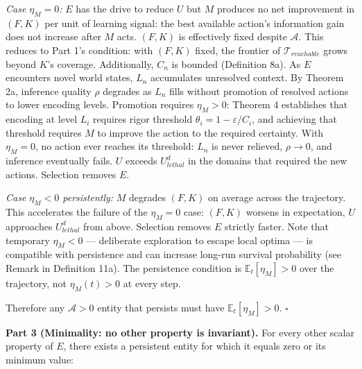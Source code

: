 \documentclass[
]{article}
\begin{document}
\emph{Case \(\eta_M = 0\):} \(E\) has the drive to reduce \(U\) but
\(M\) produces no net improvement in \((F, K)\) per unit of learning
signal: the best available action's information gain does not increase
after \(M\) acts. \((F, K)\) is effectively fixed despite
\(\mathcal{A}\). This reduces to Part 1's condition: with \((F, K)\)
fixed, the frontier of \(\mathcal{T}_{reachable}\) grows beyond \(K\)'s
coverage. Additionally, \(C_n\) is bounded (Definition 8a). As \(E\)
encounters novel world states, \(L_n\) accumulates unresolved context.
By Theorem 2a, inference quality \(\rho\) degrades as \(L_n\) fills
without promotion of resolved actions to lower encoding levels.
Promotion requires \(\eta_M > 0\): Theorem 4 establishes that encoding
at level \(L_i\) requires rigor threshold
\(\theta_i = 1 - \varepsilon/C_i\), and achieving that threshold
requires \(M\) to improve the action to the required certainty. With
\(\eta_M = 0\), no action ever reaches its threshold: \(L_n\) is never
relieved, \(\rho \to 0\), and inference eventually fails. \(U\) exceeds
\(U_{lethal}^d\) in the domains that required the new actions. Selection
removes \(E\).

\emph{Case \(\eta_M < 0\) persistently:} \(M\) degrades \((F, K)\) on
average across the trajectory. This accelerates the failure of the
\(\eta_M = 0\) case: \((F, K)\) worsens in expectation, \(U\) approaches
\(U_{lethal}^d\) from above. Selection removes \(E\) strictly faster.
Note that temporary \(\eta_M < 0\) --- deliberate exploration to escape
local optima --- is compatible with persistence and can increase
long-run survival probability (see Remark in Definition 11a). The
persistence condition is \(\mathbb{E}_t[\eta_M] > 0\) over the
trajectory, not \(\eta_M(t) > 0\) at every step.

Therefore any \(\mathcal{A} > 0\) entity that persists must have
\(\mathbb{E}_t[\eta_M] > 0\). \(\square\)

\textbf{Part 3 (Minimality: no other property is invariant).} For every
other scalar property of \(E\), there exists a persistent entity for
which it equals zero or its minimum value:
\end{document}
